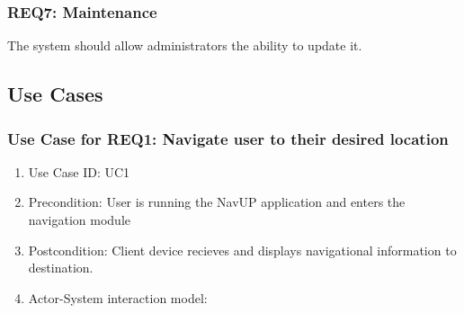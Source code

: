 \documentclass[11pt, a4paper]{article}
\begin{document}
		\subsubsection{REQ7: Maintenance}
			The system should allow administrators the ability to update it.
			
	\subsection{Use Cases}
		\subsubsection{Use Case for REQ1: Navigate user to their desired location}
			\begin{enumerate}
			\renewcommand{\labelenumi}{{\textbf{\arabic{enumi}.}}}
			\item Use Case ID: UC1
			\item Precondition: User is running the NavUP application and enters the navigation module
			\item Postcondition: Client device recieves and displays navigational information to destination.
			\item Actor-System interaction model:
			\end{enumerate}
\end{document}
